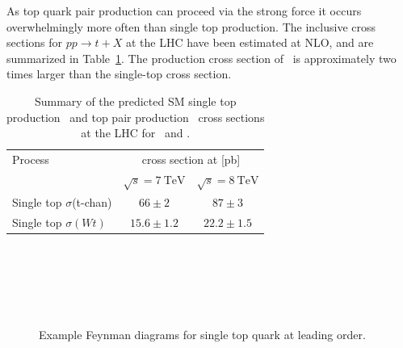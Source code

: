 As top quark pair production can proceed via the strong force it occurs overwhelmingly more often than single top production. The inclusive cross sections for $pp\rightarrow t+X$ at the LHC have been estimated at NLO, and are summarized in Table~\ref{tab:TopQuarkPredictionCrossSection}. The production cross section of \ttbar\ is approximately two times larger than the single-top cross section.
~
\begin{table}[htbp]
  \centering
  \begin{tabular}{@{}lcc@{}}
  \toprule
  Process & \multicolumn{2}{c}{cross section at [\si{\pico\barn}]} \\
  \cmidrule{2-3}
  & $\sqrt{s}=\SI{7}{\TeV}$ & $\sqrt{s}=\SI{8}{\TeV}$ \\
  \midrule
  Single top $\sigma$(t-chan)  & $66\pm2$         & $87\pm3$     \\
  Single top $\sigma(Wt)$      & $15.6\pm1.2$     & $22.2\pm1.5$ \\
  \bottomrule
  \end{tabular}
  \caption[Summary of the predicted SM single top production and top pair production cross sections at the LHC for \cmsS\ and \cmsE.]{Summary of the predicted SM single top production~\cite{Kidonakis:2012rm} and top pair production~\cite{Czakon:2013goa} cross sections at the LHC for \cmsS\ and \cmsE.} \label{tab:TopQuarkPredictionCrossSection}
\end{table}
~
\begin{figure}[htpb]
  \centering
  \begin{minipage}[][][t]{.47\textwidth}
    \centering
    
     \label{fig:TopSingleSChannel}
  \end{minipage}
  \,
  \begin{minipage}[][][t]{.47\textwidth}
    \centering
    
     \label{fig:TopSingletWChannel}
  \end{minipage}

  \begin{minipage}[][][t]{.47\textwidth}
    \centering
    
     \label{fig:TopSingleqtbChannel}
  \end{minipage}
  \,
  \begin{minipage}[][][t]{.47\textwidth}
    \centering
    
     \label{fig:TopSingleqtChannel}
  \end{minipage}
  \caption{Example Feynman diagrams for single top quark at leading order.}
  \label{fig:TopSingleProduction}
\end{figure}

